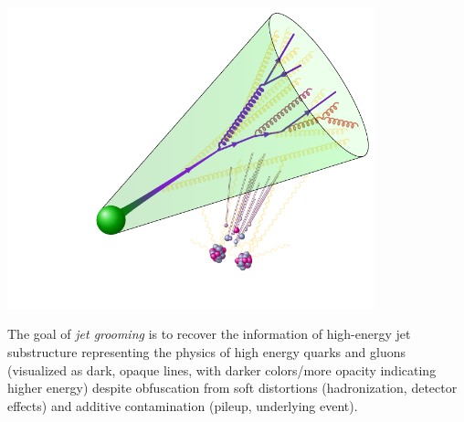 \begin{sourcefigure}[t!]
    \centering
    \includegraphics[width=0.8\textwidth]{figures/picturebook/jet-contamination}

    \caption{
        The goal of \emph{jet grooming} is to recover the information of high-energy jet substructure representing the physics of high energy quarks and gluons (visualized as dark, opaque lines, with darker colors/more opacity indicating higher energy) despite obfuscation from soft distortions (hadronization, detector effects) and additive contamination (pileup, underlying event).
    }

    \label{fig:picturebook_substructure}
\end{sourcefigure}


